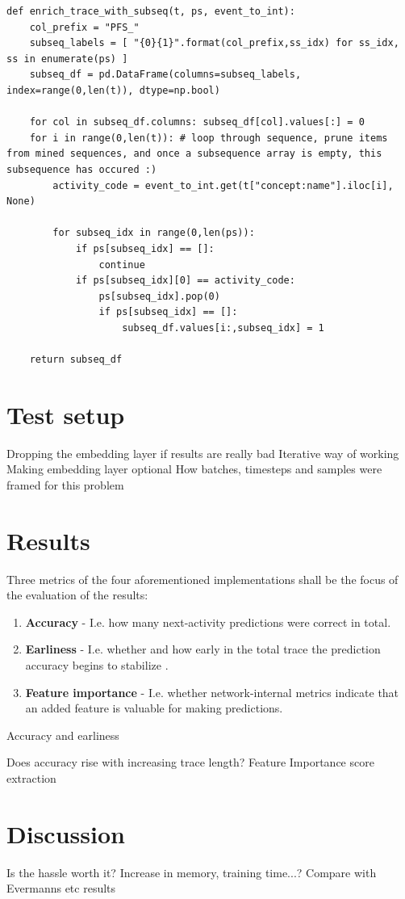 \begin{lstlisting}
def enrich_trace_with_subseq(t, ps, event_to_int):
    col_prefix = "PFS_"
    subseq_labels = [ "{0}{1}".format(col_prefix,ss_idx) for ss_idx, ss in enumerate(ps) ]
    subseq_df = pd.DataFrame(columns=subseq_labels, index=range(0,len(t)), dtype=np.bool)
    
    for col in subseq_df.columns: subseq_df[col].values[:] = 0
    for i in range(0,len(t)): # loop through sequence, prune items from mined sequences, and once a subsequence array is empty, this subsequence has occured :)
        activity_code = event_to_int.get(t["concept:name"].iloc[i], None)
        
        for subseq_idx in range(0,len(ps)):
            if ps[subseq_idx] == []:
                continue
            if ps[subseq_idx][0] == activity_code:
                ps[subseq_idx].pop(0)
                if ps[subseq_idx] == []:
                    subseq_df.values[i:,subseq_idx] = 1
        
    return subseq_df
\end{lstlisting}

\section{Test setup}
Dropping the embedding layer if results are really bad
Iterative way of working
Making embedding layer optional
How batches, timesteps and samples were framed for this problem

\section{Results}
Three metrics of the four aforementioned implementations shall be the focus of the evaluation of the results:
\begin{enumerate}
    \item\textbf{Accuracy} - I.e. how many next-activity predictions were correct in total.
    \item\textbf{Earliness} - I.e. whether and how early in the total trace the prediction accuracy begins to stabilize \cite{francescomarino2015}.
    \item\textbf{Feature importance} - I.e. whether network-internal metrics indicate that an added feature is valuable for making predictions.
\end{enumerate}

Accuracy and earliness

Does accuracy rise with increasing trace length?
Feature Importance score extraction

\section{Discussion}
Is the hassle worth it?
Increase in memory, training time...?
Compare with Evermanns etc results
